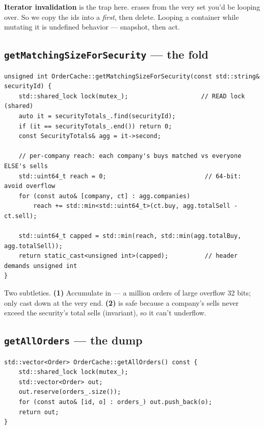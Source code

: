 \begin{pitfall}
\textbf{Iterator invalidation} is the trap here. 
erases from the very set you'd be looping over. So we copy the ids into a
 \emph{first}, then delete. Looping a container while mutating it is
undefined behavior --- snapshot, then act.
\end{pitfall}

\subsection{\texttt{getMatchingSizeForSecurity} --- the fold}

\begin{lstlisting}
unsigned int OrderCache::getMatchingSizeForSecurity(const std::string& securityId) {
    std::shared_lock lock(mutex_);                    // READ lock (shared)
    auto it = securityTotals_.find(securityId);
    if (it == securityTotals_.end()) return 0;
    const SecurityTotals& agg = it->second;

    // per-company reach: each company's buys matched vs everyone ELSE's sells
    std::uint64_t reach = 0;                           // 64-bit: avoid overflow
    for (const auto& [company, ct] : agg.companies)
        reach += std::min<std::uint64_t>(ct.buy, agg.totalSell - ct.sell);

    std::uint64_t capped = std::min(reach, std::min(agg.totalBuy, agg.totalSell));
    return static_cast<unsigned int>(capped);          // header demands unsigned int
}
\end{lstlisting}

\begin{pitfall}
Two subtleties. \textbf{(1)} Accumulate in  --- a million orders
of large  overflow 32 bits; only cast down at the very end. \textbf{(2)}
 is safe because a company's sells never exceed the
security's total sells (invariant), so it can't underflow.
\end{pitfall}

\subsection{\texttt{getAllOrders} --- the dump}

\begin{lstlisting}
std::vector<Order> OrderCache::getAllOrders() const {
    std::shared_lock lock(mutex_);
    std::vector<Order> out;
    out.reserve(orders_.size());
    for (const auto& [id, o] : orders_) out.push_back(o);
    return out;
}
\end{lstlisting}

